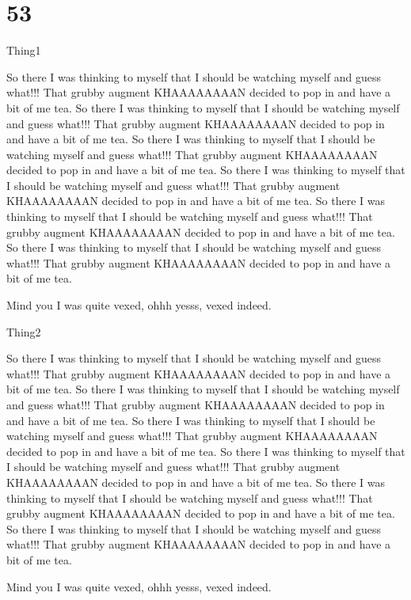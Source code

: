 \chapter{53}

\begin{define}{Thing1} 

So there I was thinking to myself that I should be 
watching myself and guess what!!!
That grubby augment KHAAAAAAAAN decided to pop in and have a bit of
me tea. 
So there I was thinking to myself that I should be 
watching myself and guess what!!!
That grubby augment KHAAAAAAAAN decided to pop in and have a bit of
me tea. So there I was thinking to myself that I should be 
watching myself and guess what!!!
That grubby augment KHAAAAAAAAN decided to pop in and have a bit of
me tea. So there I was thinking to myself that I should be 
watching myself and guess what!!!
That grubby augment KHAAAAAAAAN decided to pop in and have a bit of
me tea. 
So there I was thinking to myself that I should be 
watching myself and guess what!!!
That grubby augment KHAAAAAAAAN decided to pop in and have a bit of
me tea. So there I was thinking to myself that I should be 
watching myself and guess what!!!
That grubby augment KHAAAAAAAAN decided to pop in and have a bit of
me tea. 

Mind you I was quite vexed, ohhh yesss, vexed indeed.   

\end{define}

\begin{define}{Thing2}

So there I was thinking to myself that I should be 
watching myself and guess what!!!
That grubby augment KHAAAAAAAAN decided to pop in and have a bit of
me tea. 
So there I was thinking to myself that I should be 
watching myself and guess what!!!
That grubby augment KHAAAAAAAAN decided to pop in and have a bit of
me tea. So there I was thinking to myself that I should be 
watching myself and guess what!!!
That grubby augment KHAAAAAAAAN decided to pop in and have a bit of
me tea. So there I was thinking to myself that I should be 
watching myself and guess what!!!
That grubby augment KHAAAAAAAAN decided to pop in and have a bit of
me tea. 
So there I was thinking to myself that I should be 
watching myself and guess what!!!
That grubby augment KHAAAAAAAAN decided to pop in and have a bit of
me tea. So there I was thinking to myself that I should be 
watching myself and guess what!!!
That grubby augment KHAAAAAAAAN decided to pop in and have a bit of
me tea. 

Mind you I was quite vexed, ohhh yesss, vexed indeed.   

\end{define}

